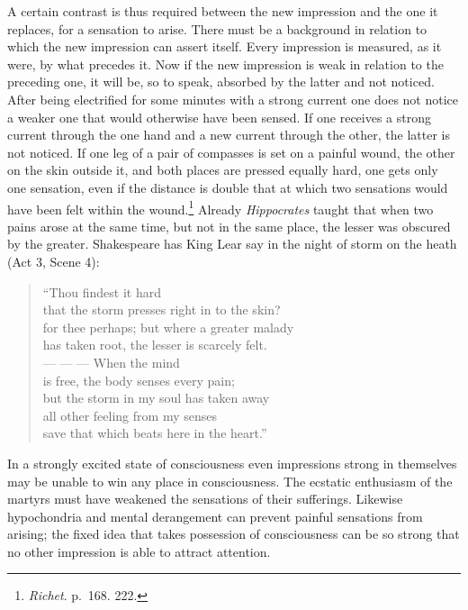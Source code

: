 \documentclass[12pt,a4paper]{book}
\newcommand{\opage}[1]{\marginnote{\footnotesize\textit{[#1]}}}
\begin{document}
A certain contrast is thus required between the new impression and the
one it replaces, for a sensation to arise. There must be a background in
relation to which the new impression can assert itself. Every impression
is measured, as it were, by what precedes it. Now if the new impression
is weak in relation to the preceding one, it will be, so to speak,
absorbed by the latter and not noticed. After being electrified for some
minutes with a strong current one does not notice a weaker one that
would otherwise have been sensed.
\opage{132}If one receives a strong current through the one hand and a
new current through the other, the latter is not noticed. If one leg of
a pair of compasses is set on a painful wound, the other on the skin
outside it, and both places are pressed equally hard, one gets only one
sensation, even if the distance is double that at which two sensations
would have been felt within the
wound.\footnote{\emph{Richet}. p.~168. 222.} Already
\emph{Hippocrates} taught that when two pains arose at the same time,
but not in the same place, the lesser was obscured by the greater.
Shakespeare has King Lear say in the night of storm on the heath (Act 3,
Scene 4):

\begin{verse}
``Thou findest it hard\\
that the storm presses right in to the skin?\\
for thee perhaps; but where a greater malady\\
has taken root, the lesser is scarcely felt.\\
--- --- --- When the mind\\
is free, the body senses every pain;\\
but the storm in my soul has taken away\\
all other feeling from my senses\\
save that which beats here in the heart.''
\end{verse}

In a strongly excited state of consciousness even impressions strong in
themselves may be unable to win any place in consciousness. The ecstatic
enthusiasm of the martyrs must have weakened the sensations of their
sufferings. Likewise hypochondria and mental derangement can prevent
painful sensations from arising; the fixed idea that takes possession of
consciousness can be so strong that no other impression is able to
attract attention.
\end{document}
